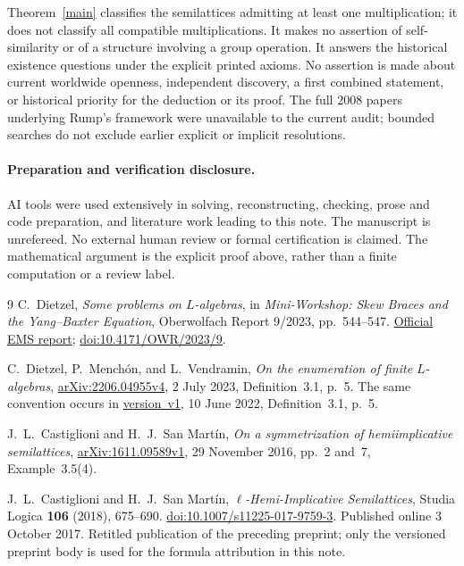 \documentclass[11pt]{article}
\begin{document}
Theorem~\ref{main} classifies the semilattices admitting at least one
multiplication; it does not classify all compatible multiplications.
It makes no assertion of self-similarity or of a structure involving a
group operation. It answers the historical existence questions under the
explicit printed axioms. No assertion is made about current worldwide
openness, independent discovery, a first combined statement, or historical
priority for the deduction or its proof.
The full 2008 papers underlying Rump's framework were unavailable to the
current audit; bounded searches do not exclude earlier explicit or implicit
resolutions.

\paragraph{Preparation and verification disclosure.}
AI tools were used extensively in solving, reconstructing, checking,
prose and code preparation, and literature work leading to this note.
The manuscript is unrefereed. No external human review or formal
certification is claimed. The mathematical argument is the explicit
proof above, rather than a finite computation or a review label.

\begin{thebibliography}{9}
C.~Dietzel, \emph{Some problems on \(L\)-algebras}, in
\emph{Mini-Workshop: Skew Braces and the Yang--Baxter Equation},
Oberwolfach Report 9/2023, pp.~544--547.
\href{https://ems.press/content/serial-article-files/47003}{Official EMS report};
\href{https://doi.org/10.4171/OWR/2023/9}{doi:10.4171/OWR/2023/9}.

C.~Dietzel, P.~Mench\'on, and L.~Vendramin,
\emph{On the enumeration of finite \(L\)-algebras},
\href{https://arxiv.org/abs/2206.04955v4}{arXiv:2206.04955v4},
2 July 2023, Definition~3.1, p.~5.
The same convention occurs in
\href{https://arxiv.org/abs/2206.04955v1}{version~v1}, 10 June 2022,
Definition~3.1, p.~5.

J.~L.~Castiglioni and H.~J.~San Mart\'in,
\emph{On a symmetrization of hemiimplicative semilattices},
\href{https://arxiv.org/abs/1611.09589v1}{arXiv:1611.09589v1},
29 November 2016, pp.~2 and~7, Example~3.5(4).

J.~L.~Castiglioni and H.~J.~San Mart\'in,
\emph{\(\ell\)-Hemi-Implicative Semilattices},
Studia Logica \textbf{106} (2018), 675--690.
\href{https://doi.org/10.1007/s11225-017-9759-3}{doi:10.1007/s11225-017-9759-3}.
Published online 3 October 2017. Retitled publication of the preceding
preprint; only the versioned preprint body is used for the formula
attribution in this note.
\end{thebibliography}
\end{document}
